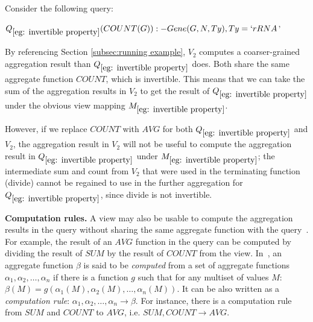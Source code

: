 \begin{example} \label{eg: invertible property}
Consider the following query:
\begin{tabbing}
$Q_{\ref{eg: invertible property}}(COUNT(G)):- Gene(G, N, Ty), Ty = `rRNA$'
\end{tabbing}

By referencing Section \ref{subsec:running example}, $V_2$ computes a coarser-grained aggregation result than $Q_{\ref{eg: invertible property}}$ does. Both %
share the same aggregate function $COUNT$, which is invertible. %
This means that we can take the sum of the aggregation results in $V_2$ to get the result of $Q_{\ref{eg: invertible property}}$ under the obvious view mapping $M_{\ref{eg: invertible property}}$.%

However, if we replace $COUNT$ with $AVG$ for both $Q_{\ref{eg: invertible property}}$ and $V_2$,
the aggregation result in $V_2$ will not be useful to compute the aggregation result in $Q_{\ref{eg: invertible property}}$ under $M_{\ref{eg: invertible property}}$;  the intermediate sum and count from $V_2$ that were used in the terminating function (divide) cannot be regained to use in the further aggregation for $Q_{\ref{eg: invertible property}}$, since divide is not invertible.
\end{example}

\textbf{Computation rules.}  
A view may also be usable to compute the aggregation results in the query without sharing the same aggregate function with the query~\cite{cohen2006user}. For example, the result of an $AVG$ function in the query can be computed by dividing the result of $SUM$ by the result of $COUNT$ from the view. In~\cite{cohen2006rewriting}, an aggregate function $\beta$ is said to be {\em computed} from a set of aggregate functions $\alpha_1, \alpha_2, \dots, \alpha_n$ if there is a function $g$ such that for any multiset of values $M$: $\beta(M) = g(\alpha_1(M), \alpha_2(M), \dots, \alpha_n(M))$. It can be also written as a {\em computation rule}: $\alpha_1, \alpha_2, \dots, \alpha_n \rightarrow \beta$. For instance, there is a computation rule from $SUM$ and $COUNT$ to $AVG$, i.e. $SUM, COUNT \rightarrow AVG$. 

